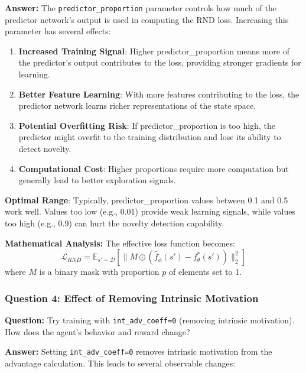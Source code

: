 \documentclass[12pt]{article}
\begin{document}
{{{\textbf{Answer:} The \texttt{predictor\_proportion} parameter controls how much of the predictor network's output is used in computing the RND loss. Increasing this parameter has several effects:

\begin{enumerate}
    \item \textbf{Increased Training Signal}: Higher predictor\_proportion means more of the predictor's output contributes to the loss, providing stronger gradients for learning.
    
    \item \textbf{Better Feature Learning}: With more features contributing to the loss, the predictor network learns richer representations of the state space.
    
    \item \textbf{Potential Overfitting Risk}: If predictor\_proportion is too high, the predictor might overfit to the training distribution and lose its ability to detect novelty.
    
    \item \textbf{Computational Cost}: Higher proportions require more computation but generally lead to better exploration signals.
\end{enumerate}

\textbf{Optimal Range}: Typically, predictor\_proportion values between 0.1 and 0.5 work well. Values too low (e.g., 0.01) provide weak learning signals, while values too high (e.g., 0.9) can hurt the novelty detection capability.

\textbf{Mathematical Analysis:} The effective loss function becomes:
\begin{equation}
\mathcal{L}_{RND} = \mathbb{E}_{s' \sim \mathcal{D}} \left[ \|M \odot (\hat{f}_\phi(s') - f^*_\theta(s'))\|_2^2 \right]
\end{equation}
where $M$ is a binary mask with proportion $p$ of elements set to 1.
    
\subsubsection{Question 4: Effect of Removing Intrinsic Motivation}

\textbf{Question:} Try training with \texttt{int\_adv\_coeff=0} (removing intrinsic motivation). How does the agent's behavior and reward change?

\textbf{Answer:} Setting \texttt{int\_adv\_coeff=0} removes intrinsic motivation from the advantage calculation. This leads to several observable changes:

}}}
\end{document}
